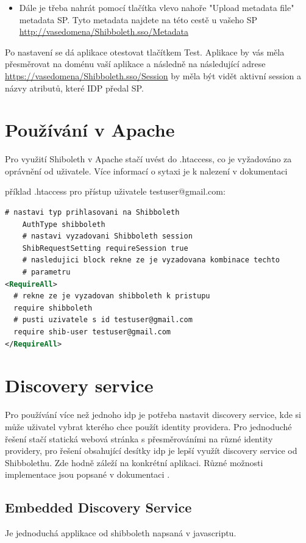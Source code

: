 \begin{itemize}
    \item Dále je třeba nahrát pomocí tlačítka vlevo nahoře "Upload metadata file" metadata SP. Tyto metadata najdete na této cestě u vašeho SP \url{http://vasedomena/Shibboleth.sso/Metadata}

\end{itemize}

Po nastavení se dá aplikace otestovat tlačítkem Test. Aplikace by vás měla přesměrovat na doménu vaší aplikace a následně na následující adrese \url{https://vasedomena/Shibboleth.sso/Session} by měla být vidět aktivní session a názvy atributů, které IDP předal SP.

\section{Používání v Apache}

Pro využití Shiboleth v Apache stačí uvést do .htaccess, co je vyžadováno za oprávnění od uživatele. Více informací o sytaxi je k nalezení v dokumentaci\cite{SPApache}\cite{SPhtaccess} \linebreak

příklad .htaccess pro přístup uživatele testuser@gmail.com:

 \begin{lstlisting}[language=XML]
    # nastavi typ prihlasovani na Shibboleth
    AuthType shibboleth
    # nastavi vyzadovani Shibboleth session
    ShibRequestSetting requireSession true
    # nasledujici block rekne ze je vyzadovana kombinace techto
    # parametru
<RequireAll>
  # rekne ze je vyzadovan shibboleth k pristupu
  require shibboleth 
  # pusti uzivatele s id testuser@gmail.com
  require shib-user testuser@gmail.com 
</RequireAll>
    \end{lstlisting}


\section{Discovery service}
Pro používání více než jednoho idp je potřeba nastavit discovery service, kde si může uživatel vybrat kterého chce použít identity providera. Pro jednoduché řešení stačí statická webová stránka s přesměrováními na různé identity providery, pro řešení obsahující desítky idp je lepší využít discovery service od Shibbolethu. Zde hodně záleží na konkrétní aplikaci. Různé možnosti implementace jsou popsané v dokumentaci \cite{IdPDiscovery}.

\subsection{Embedded Discovery Service}
Je jednoduchá applikace od shibboleth napsaná v javascriptu. 

